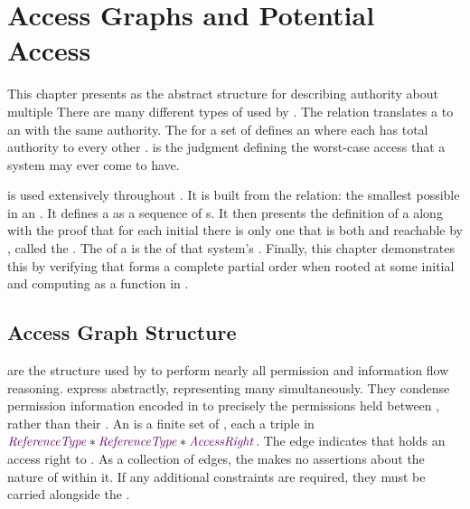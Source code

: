 \chapter{Access Graphs and Potential Access}
\label{ch:access}

This chapter presents \TMaccessGraphs{} as the abstract structure for describing authority about multiple \TMsystemStates{}
There are many different types of \TMaccessGraphs{} used by \TMmodelName{}.
The \TMdirAcc{} relation translates a \TMsystemState{} to an \TMaccessGraph{} with the same authority.
The \TMcompleteAG{} for a set of \TMobjs{} defines an \TMaccessGraph{} where each \TMobj{} has total authority to every other \TMobj{}.
\Term{\TMpotAcc} is the judgment defining the worst-case access that a system may ever come to have.

\Term{\TMpotAcc{}} is used extensively throughout \TMmodelName{}.
It is built from the \COQtransfer{} relation: the smallest possible \TMaccessRight{} \TMtransfer{} in an \TMaccessGraph{}.
It defines a \TMpotTransfer{} as a sequence of \COQtransfer{}s.
It then presents the definition of a \TMmaximal{} \TMaccessGraph{} along with the proof that for each initial \TMaccessGraph{} there is only one \TMaccessGraph{} that is both \TMmaximal{} and reachable by \TMpotTransfer{}, called the \TMpotAccAG{}.
The \TMpotAcc{} of a \TMsystemState{} is the \TMpotAccAG{} of that system's \TMdirAccAG{}.
Finally, this chapter demonstrates this by verifying that \TMpotTransfer{} forms a complete partial order when rooted at some initial \TMaccessGraph{} and computing \TMpotAcc{} as a function in \COQSet{}.

\section{Access Graph Structure}

\Term{\TMaccessGraphs} are the structure used by \TMmodelName{}  to perform nearly all permission and information flow reasoning.
\xmakefirstuc{\TMaccessGraphs{}} express \TMsystemStates{} abstractly, representing many \TMsystemStates{} simultaneously.
They condense permission information encoded in \TMsystemState{} to precisely the permissions held between \TMobjs{}, rather than their \TMcaps{}.
An \TMaccessGraph{} is a finite set of \term{\TMaccessEdges}, each a triple in \( \COQReferenceType{} * \COQReferenceType{} * \COQAccessRight{} \).
The edge  indicates that  holds an  access right to .
As a collection of edges, the \TMaccessGraph{} makes no assertions about the nature of \TMobjs{} within it.
If any additional constraints are required, they must be carried alongside the \TMaccessGraph{}.

